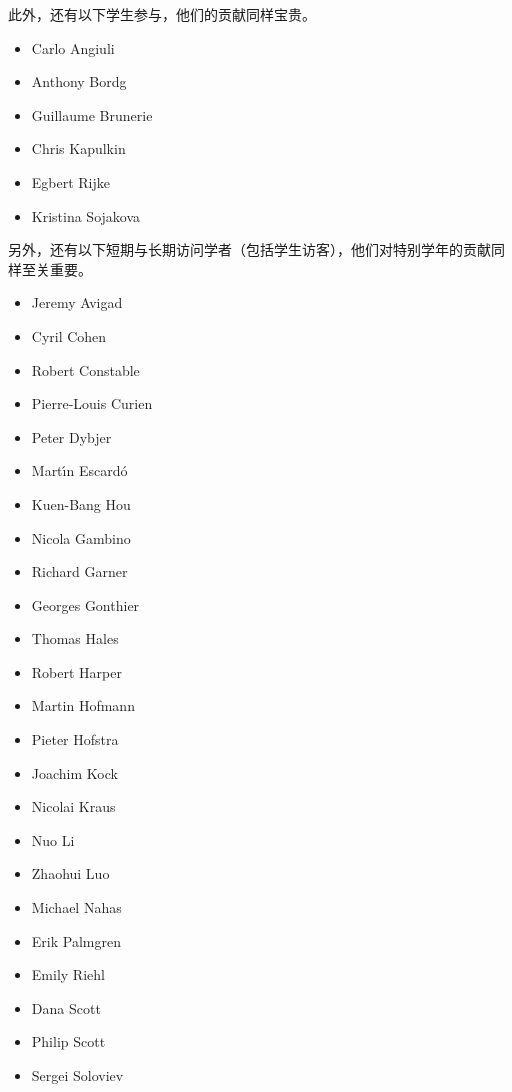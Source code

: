 \noindent 此外，还有以下学生参与，他们的贡献同样宝贵。

\begin{multicols}{\OPTprefacecols}{
\begin{itemize}
\item[] Carlo Angiuli
\item[] Anthony Bordg
\item[] Guillaume Brunerie
\item[] Chris Kapulkin
\item[] Egbert Rijke
\item[] Kristina Sojakova
\end{itemize}
}
\end{multicols}

\noindent 另外，还有以下短期与长期访问学者（包括学生访客），他们对特别学年的贡献同样至关重要。

\begin{multicols}{\OPTprefacecols}{
\begin{itemize}
\item[] Jeremy Avigad
\item[] Cyril Cohen
\item[] Robert Constable
\item[] Pierre-Louis Curien
\item[] Peter Dybjer
\item[] Mart{\'\i}n Escard{\'o}
\item[] Kuen-Bang Hou
\item[] Nicola Gambino
\item[] Richard Garner
\item[] Georges Gonthier
\item[] Thomas Hales
\item[] Robert Harper
\item[] Martin Hofmann
\item[] Pieter Hofstra
\item[] Joachim Kock
\item[] Nicolai Kraus
\item[] Nuo Li
\item[] Zhaohui Luo
\item[] Michael Nahas
\item[] Erik Palmgren
\item[] Emily Riehl
\item[] Dana Scott
\item[] Philip Scott
\item[] Sergei Soloviev
\end{itemize}
}
\end{multicols}

